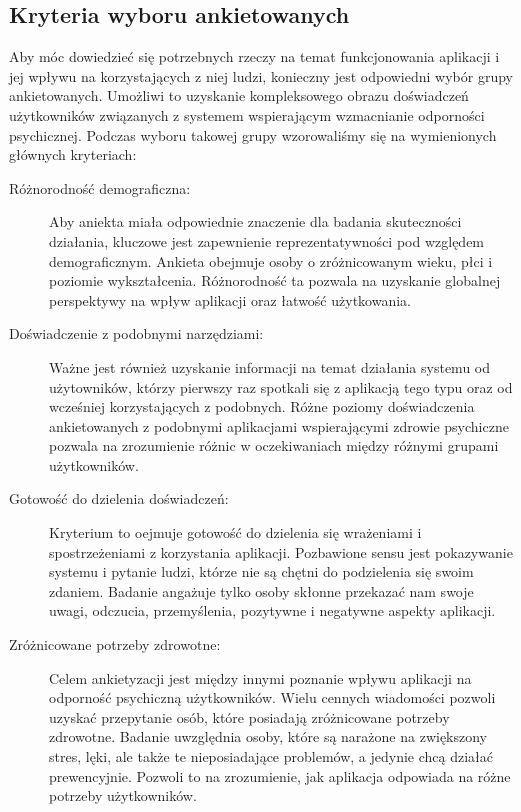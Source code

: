 \subsection{Kryteria wyboru ankietowanych}
Aby móc dowiedzieć się potrzebnych rzeczy na temat funkcjonowania aplikacji i
jej wpływu na korzystających z niej ludzi, konieczny jest odpowiedni wybór grupy
ankietowanych. Umożliwi to uzyskanie kompleksowego obrazu doświadczeń
użytkowników związanych z systemem wspierającym wzmacnianie odporności
psychicznej. Podczas wyboru takowej grupy wzorowaliśmy się na wymienionych
głównych kryteriach:
\begin{description}
    \item[Różnorodność demograficzna:] 
    Aby aniekta miała odpowiednie znaczenie dla badania skuteczności działania,
    kluczowe jest zapewnienie reprezentatywności pod względem demograficznym.
    Ankieta obejmuje osoby o zróżnicowanym wieku, płci i poziomie wykształcenia.
    Różnorodność ta pozwala na uzyskanie globalnej perspektywy na wpływ
    aplikacji oraz łatwość użytkowania.
    \item[Doświadczenie z podobnymi narzędziami:] Ważne jest również uzyskanie
    informacji na temat działania systemu od użytowników, którzy pierwszy raz
    spotkali się z aplikacją tego typu oraz od wcześniej korzystających z
    podobnych. Różne poziomy doświadczenia ankietowanych z podobnymi aplikacjami
    wspierającymi zdrowie psychiczne pozwala na zrozumienie różnic w
    oczekiwaniach między różnymi grupami użytkowników.
    \item[Gotowość do dzielenia doświadczeń:] Kryterium to oejmuje gotowość do
    dzielenia się wrażeniami i spostrzeżeniami z korzystania aplikacji.
    Pozbawione sensu jest pokazywanie systemu i pytanie ludzi, którze nie są
    chętni do podzielenia się swoim zdaniem. Badanie angażuje tylko osoby
    skłonne przekazać nam swoje uwagi, odczucia, przemyślenia, pozytywne i
    negatywne aspekty aplikacji.
    \item[Zróżnicowane potrzeby zdrowotne:] Celem ankietyzacji jest między
    innymi poznanie wpływu aplikacji na odporność psychiczną użytkowników. Wielu
    cennych wiadomości pozwoli uzyskać przepytanie osób, które posiadają
    zróżnicowane potrzeby zdrowotne. Badanie uwzględnia osoby, które są narażone
    na zwiększony stres, lęki, ale także te nieposiadające problemów, a jedynie
    chcą działać prewencyjnie. Pozwoli to na zrozumienie, jak aplikacja
    odpowiada na różne potrzeby użytkowników. 
\end{description}
